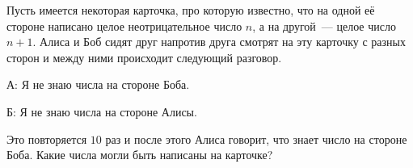 Пусть имеется некоторая карточка, про которую известно, что на одной её стороне написано целое
неотрицательное число $n$, а на другой~--- целое число $n + 1$. Алиса и Боб сидят друг напротив друга
смотрят на эту карточку с разных сторон и между ними происходит следующий разговор.
\begin{itemtask}
    \item[А:] Я не знаю числа на стороне Боба.
        \item[Б:] Я не знаю числа на стороне Алисы.
\end{itemtask}
Это повторяется $10$ раз и после этого Алиса говорит, что знает число на стороне Боба. Какие числа могли
быть написаны на карточке?